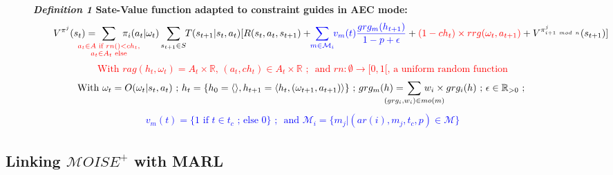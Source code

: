 \documentclass[sigconf,anonymous]{aamas}
\begin{document}
\begin{figure*}[t]
    \label{eq:single_value_function}
    \raggedright
    \textbf{\textit{Definition 1} \quad Sate-Value function adapted to constraint guides in AEC mode:}
    \begin{gather*}
      \text{\quad \quad} V^{\pi^j}(s_t) = \hspace{-0.75cm} \sum_{\textcolor{red}{ \substack{a_{t} \in A \text{ if } rn() < ch_{t}, \\ 
      a_{t} \in A_{t} \text{ else}}
      }}{\hspace{-0.7cm} \pi_i(a_{t} | \omega_t)} \sum_{s_{t+1} \in S}{\hspace{-0.1cm} T(s_{t+1} | s_t, a_{t})[R(s_t,a_{t},s_{t+1}) + \hspace{-0.1cm} \textcolor{blue}{ \sum_{m \in \mathcal{M}_i}{ \hspace{-0.1cm} v_m(t) \frac{grg_m(h_{t+1})}{1 - p + \epsilon} } } + \textcolor{red}{(1-ch_t) \times rrg(\omega_t,a_{t+1})} + V^{\pi^j_{i+1 \ mod \ n}}(s_{t+1})]}
    \end{gather*}  
    \textcolor{red}{\[\text{With } rag(h_t, \omega_t) = A_{t} \times \mathbb{R} \text{, } (a_t, ch_{t}) \in A_{t} \times \mathbb{R} \text{ ; } \text{ and } rn: \emptyset \to [0,1[ \text{, a uniform random function}\]}
    \vspace{-0.5cm}
    \textcolor{blue}{
    \begin{gather*}
    \text{With } \omega_t = O(\omega_t | s_t, a_t) \text{ ; } h_t = \{h_0 = \langle \rangle, h_{t+1} = \langle h_t, (\omega_{t+1}, a_{t+1}) \rangle \} \text{ ; } grg_m(h) = \hspace{-0.8cm} \sum_{(grg_i,w_i) \in mo(m)}{\hspace{-0.8cm} w_i \times grg_i(h)} \text{ ; } \epsilon \in \mathbb{R}_{>0} \text{ ; }
    \end{gather*}
    }
    \vspace{-0.75cm}
    \textcolor{blue}{
    \begin{gather*}
    v_m(t) = \{ 1 \text{ if } t \in t_c \text{ ; else } 0 \} \text{ ; } \text{ and } \mathcal{M}_i = \{m_j | (ar(i),m_j,t_c,p) \in \mathcal{M}\}
    \end{gather*}
    }
    \vspace{-0.6cm}
\end{figure*}

\subsection{Linking $\mathcal{M}OISE^+$ with MARL}
\end{document}
